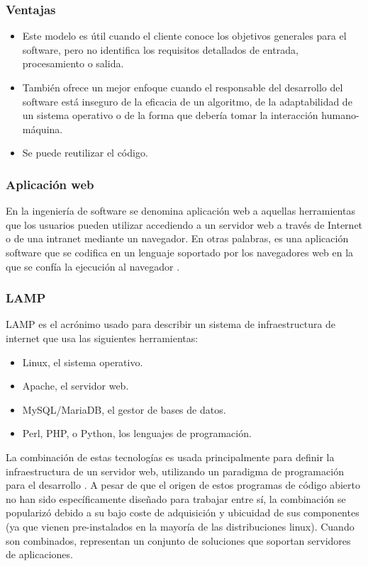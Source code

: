 \subsubsection{Ventajas}

\begin{itemize}
	\item Este modelo es útil cuando el cliente conoce los objetivos generales para el software, pero no identifica los requisitos detallados de entrada, procesamiento o salida.
	\item También ofrece un mejor enfoque cuando el responsable del desarrollo del software está inseguro de la eficacia de un algoritmo, de la adaptabilidad de un sistema operativo o de la forma que debería tomar la interacción humano-máquina.
	\item Se puede reutilizar el código.
\end{itemize}

\subsubsection{Aplicación web}
En la ingeniería de software se denomina aplicación web a aquellas herramientas que los usuarios pueden utilizar accediendo a un servidor web a través de Internet o de una intranet mediante un navegador. En otras palabras, es una aplicación software que se codifica en un lenguaje soportado por los navegadores web en la que se confía la ejecución al navegador \citep{mora}.

\subsubsection{LAMP}

LAMP es el acrónimo usado para describir un sistema de infraestructura de internet que usa las siguientes herramientas:

\begin{itemize}
	\item Linux, el sistema operativo.
	\item Apache, el servidor web.
	\item MySQL/MariaDB, el gestor de bases de datos.
	\item Perl, PHP, o Python, los lenguajes de programación. 
\end{itemize}

La combinación de estas tecnologías es usada principalmente para definir la infraestructura de un servidor web, utilizando un paradigma de programación para el desarrollo \citep{apache}.
\vskip 0.3cm
A pesar de que el origen de estos programas de código abierto no han sido específicamente diseñado para trabajar entre sí, la combinación se popularizó debido a su bajo coste de adquisición y ubicuidad de sus componentes (ya que vienen pre-instalados en la mayoría de las distribuciones linux). Cuando son combinados, representan un conjunto de soluciones que soportan servidores de aplicaciones.

